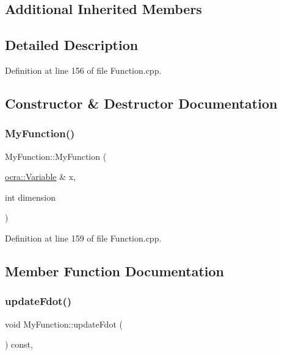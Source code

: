 \subsection*{Additional Inherited Members}


\subsection{Detailed Description}


Definition at line 156 of file Function.\+cpp.



\subsection{Constructor \& Destructor Documentation}
\hypertarget{classMyFunction_addcad41fa4e120bf9decb70b4b22f935}{}\label{classMyFunction_addcad41fa4e120bf9decb70b4b22f935} 
\subsubsection{\texorpdfstring{My\+Function()}{MyFunction()}}
{\footnotesize\ttfamily My\+Function\+::\+My\+Function (\begin{DoxyParamCaption}\item[{\hyperlink{classocra_1_1Variable}{ocra\+::\+Variable} \&}]{x,  }\item[{int}]{dimension }\end{DoxyParamCaption})\hspace{0.3cm}{\ttfamily [inline]}}



Definition at line 159 of file Function.\+cpp.



\subsection{Member Function Documentation}
\hypertarget{classMyFunction_af0219da97114570582c6a02cf072a7db}{}\label{classMyFunction_af0219da97114570582c6a02cf072a7db} 
\subsubsection{\texorpdfstring{update\+Fdot()}{updateFdot()}}
{\footnotesize\ttfamily void My\+Function\+::update\+Fdot (\begin{DoxyParamCaption}{ }\end{DoxyParamCaption}) const\hspace{0.3cm}{\ttfamily [inline]}, {\ttfamily [virtual]}}

